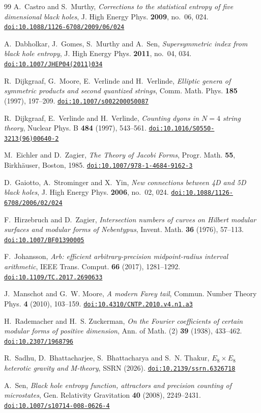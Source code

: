 \documentclass[11pt]{amsart}
\theoremstyle{definition}
\newcommand{\doi}[1]{\href{https://doi.org/#1}{\nolinkurl{doi:#1}}}
\begin{document}
\begin{thebibliography}{99}
 A.~Castro and S.~Murthy, \emph{Corrections to the statistical entropy of five dimensional black holes}, J. High Energy Phys. \textbf{2009}, no.~06, 024. \doi{10.1088/1126-6708/2009/06/024}

 A.~Dabholkar, J.~Gomes, S.~Murthy and A.~Sen, \emph{Supersymmetric index from black hole entropy}, J. High Energy Phys. \textbf{2011}, no.~04, 034. \doi{10.1007/JHEP04(2011)034}

 R.~Dijkgraaf, G.~Moore, E.~Verlinde and H.~Verlinde, \emph{Elliptic genera of symmetric products and second quantized strings}, Comm. Math. Phys. \textbf{185} (1997), 197--209. \doi{10.1007/s002200050087}

 R.~Dijkgraaf, E.~Verlinde and H.~Verlinde, \emph{Counting dyons in $N=4$ string theory}, Nuclear Phys. B \textbf{484} (1997), 543--561. \doi{10.1016/S0550-3213(96)00640-2}

 M.~Eichler and D.~Zagier, \emph{The Theory of Jacobi Forms}, Progr. Math. \textbf{55}, Birkh\"auser, Boston, 1985. \doi{10.1007/978-1-4684-9162-3}

 D.~Gaiotto, A.~Strominger and X.~Yin, \emph{New connections between 4D and 5D black holes}, J. High Energy Phys. \textbf{2006}, no.~02, 024. \doi{10.1088/1126-6708/2006/02/024}

 F.~Hirzebruch and D.~Zagier, \emph{Intersection numbers of curves on Hilbert modular surfaces and modular forms of Nebentypus}, Invent. Math. \textbf{36} (1976), 57--113. \doi{10.1007/BF01390005}

 F.~Johansson, \emph{Arb: efficient arbitrary-precision midpoint-radius interval arithmetic}, IEEE Trans. Comput. \textbf{66} (2017), 1281--1292. \doi{10.1109/TC.2017.2690633}

 J.~Manschot and G.~W. Moore, \emph{A modern Farey tail}, Commun. Number Theory Phys. \textbf{4} (2010), 103--159. \doi{10.4310/CNTP.2010.v4.n1.a3}

 H.~Rademacher and H.~S. Zuckerman, \emph{On the Fourier coefficients of certain modular forms of positive dimension}, Ann. of Math. (2) \textbf{39} (1938), 433--462. \doi{10.2307/1968796}

 R.~Sadhu, D.~Bhattacharjee, S.~Bhattacharya and S.~N. Thakur, \emph{$E_8\times E_8$ heterotic gravity and M-theory}, SSRN (2026). \doi{10.2139/ssrn.6326718}

 A.~Sen, \emph{Black hole entropy function, attractors and precision counting of microstates}, Gen. Relativity Gravitation \textbf{40} (2008), 2249--2431. \doi{10.1007/s10714-008-0626-4}


\end{thebibliography}
\end{document}
